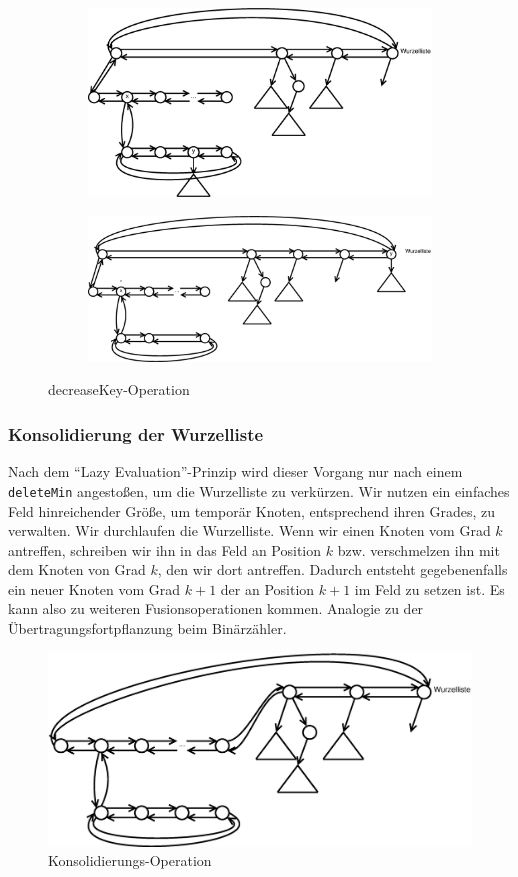 \begin{figure}[H]
\centering
\begin{subfigure}[h]{0.4\textwidth}
	\includegraphics[width=\linewidth]{21/Grafik/decreaseKey1}
\end{subfigure}
\begin{subfigure}[h]{0.4\textwidth}
	\includegraphics[width=\linewidth]{21/Grafik/decreaseKey2}
\end{subfigure}
\caption{decreaseKey-Operation}
\end{figure}


\subsubsection{Konsolidierung der Wurzelliste}
Nach dem "`Lazy Evaluation"'-Prinzip wird dieser Vorgang nur nach einem \texttt{deleteMin} angestoßen, um die Wurzelliste zu verkürzen. Wir nutzen ein einfaches Feld hinreichender Größe, um temporär Knoten, entsprechend ihren Grades, zu verwalten. Wir durchlaufen die Wurzelliste. Wenn wir einen Knoten vom Grad $k$ antreffen, schreiben wir ihn in das Feld an Position $k$ bzw. verschmelzen ihn mit dem Knoten von Grad $k$, den wir dort antreffen. Dadurch entsteht gegebenenfalls ein neuer Knoten vom Grad $k+1$ der an Position $k+1$ im Feld zu setzen ist. Es kann also zu weiteren Fusionsoperationen kommen. Analogie zu der Übertragungsfortpflanzung beim Binärzähler.

\begin{figure}[H]
	\centering
	\includegraphics[width=0.65\linewidth]{21/Grafik/insert}
	\caption{Konsolidierungs-Operation}
\end{figure}

